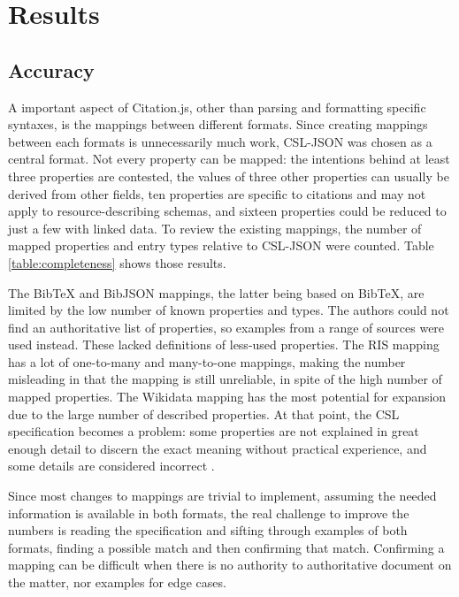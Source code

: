 \documentclass[fleqn,10pt,lineno]{wlpeerj} %
\begin{document}
\section*{Results}

\subsection*{Accuracy}

A important aspect of Citation.js, other than parsing and formatting specific syntaxes, is the mappings between different formats. Since creating mappings between each formats is unnecessarily much work, CSL-JSON was chosen as a central format. Not every property can be mapped: the intentions behind at least three properties are contested, the values of three other properties can usually be derived from other fields, ten properties are specific to citations and may not apply to resource-describing schemas, and sixteen properties could be reduced to just a few with linked data. To review the existing mappings, the number of mapped properties and entry types relative to CSL-JSON were counted. Table \ref{table:completeness} shows those results.

The BibTeX and BibJSON mappings, the latter being based on BibTeX, are limited by the low number of known properties and types. The authors could not find an authoritative list of properties, so examples from a range of sources were used instead. These lacked definitions of less-used properties. The RIS mapping has a lot of one-to-many and many-to-one mappings, making the number misleading in that the mapping is still unreliable, in spite of the high number of mapped properties. The Wikidata mapping has the most potential for expansion due to the large number of described properties. At that point, the CSL specification becomes a problem: some properties are not explained in great enough detail to discern the exact meaning without practical experience, and some details are considered incorrect \citep{wiernik_inconsistencies_2018}.

Since most changes to mappings are trivial to implement, assuming the needed information is available in both formats, the real challenge to improve the numbers is reading the specification and sifting through examples of both formats, finding a possible match and then confirming that match. Confirming a mapping can be difficult when there is no authority to authoritative document on the matter, nor examples for edge cases.
\end{document}
